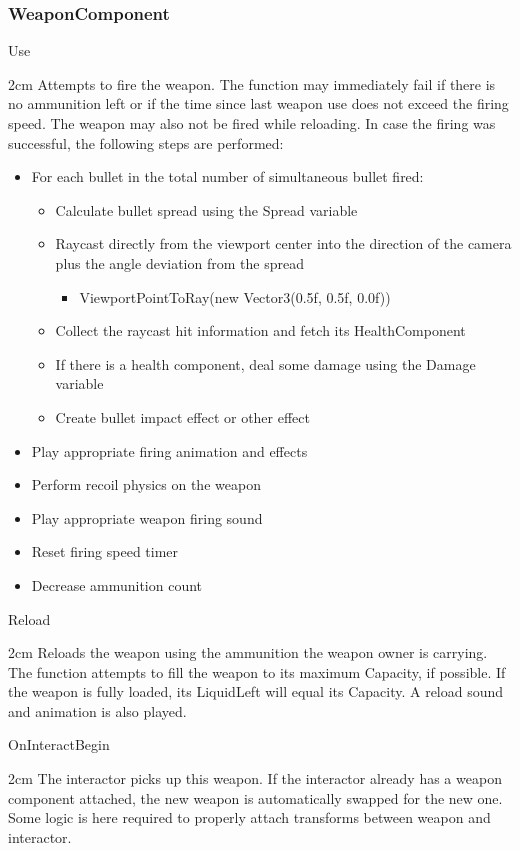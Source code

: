 \documentclass[11pt]{article}
\newenvironment{indentall}{\begin{adjustwidth}{2cm}{}}{\end{adjustwidth}}
\begin{document}
\subsubsection{WeaponComponent}
Use
\begin{indentall}
Attempts to fire the weapon. The function may immediately fail if there is no ammunition left or if the time since last weapon use does not exceed the firing speed. The weapon may also not be fired while reloading. In case the firing was successful, the following steps are performed:
\begin{itemize}
\item For each bullet in the total number of simultaneous bullet fired:
\begin{itemize}
\item Calculate bullet spread using the Spread variable
\item Raycast directly from the viewport center into the direction of the camera plus the angle deviation from the spread
\begin{itemize}
\item ViewportPointToRay(new Vector3(0.5f, 0.5f, 0.0f))
\end{itemize}
\item Collect the raycast hit information and fetch its HealthComponent
\item If there is a health component, deal some damage using the Damage variable
\item Create bullet impact effect or other effect
\end{itemize}
\item Play appropriate firing animation and effects
\item Perform recoil physics on the weapon
\item Play appropriate weapon firing sound
\item Reset firing speed timer
\item Decrease ammunition count
\end{itemize}
\end{indentall}
Reload
\begin{indentall}
Reloads the weapon using the ammunition the weapon owner is carrying. The function attempts to fill the weapon to its maximum Capacity, if possible. If the weapon is fully loaded, its LiquidLeft will equal its Capacity. A reload sound and animation is also played.
\end{indentall}
OnInteractBegin
\begin{indentall}
The interactor picks up this weapon. If the interactor already has a weapon component attached, the new weapon is automatically swapped for the new one. Some logic is here required to properly attach transforms between weapon and interactor.
\end{indentall}
\end{document}
